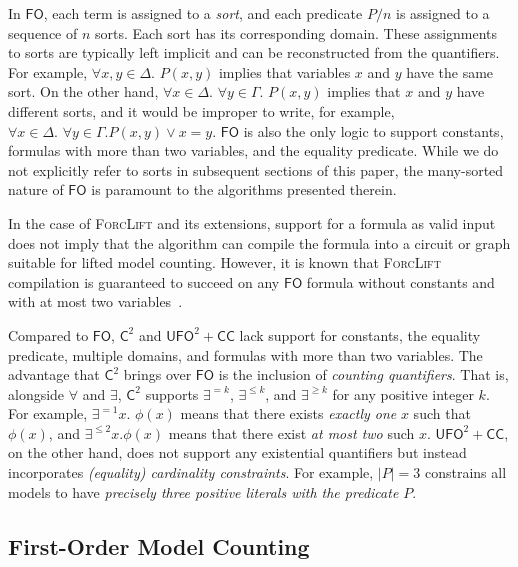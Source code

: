 \documentclass[a4paper,UKenglish,cleveref, autoref, thm-restate]{lipics-v2021}
\newcommand{\Ctwo}{$\mathsf{C}^{2}$}
\newcommand{\FO}{$\mathsf{FO}$}
\newcommand{\UFO}{$\mathsf{UFO}^{2} + \mathsf{CC}$}
\begin{document}
\renewcommand*{\thefootnote}{\arabic{footnote}}

In \FO{}, each term is assigned to a \emph{sort}, and each predicate $P/n$ is
assigned to a sequence of $n$ sorts. Each sort has its corresponding domain.
These assignments to sorts are typically left implicit and can be reconstructed
from the quantifiers. For example, $\forall x,y \in \Delta\text{. }P(x, y)$
implies that variables $x$ and $y$ have the same sort. On the other hand,
$\forall x \in \Delta\text{. }\forall y \in \Gamma\text{. } P(x, y)$ implies
that $x$ and $y$ have different sorts, and it would be improper to write, for
example, $\forall x \in \Delta\text{. }\forall y \in \Gamma\text{.
} P(x, y) \lor x = y$. \FO{} is also the only logic to support constants,
formulas with more than two variables, and the equality predicate. While we do
not explicitly refer to sorts in subsequent sections of this paper, the
many-sorted nature of \FO{} is paramount to the algorithms presented therein.

\begin{remark*}
  In the case of \textsc{ForcLift} and its extensions, support for a formula as
  valid input does not imply that the algorithm can compile the formula into a
  circuit or graph suitable for lifted model counting. However, it is known that
  \textsc{ForcLift} compilation is guaranteed to succeed on any \FO{} formula
  without constants and with at most two
  variables~\cite{DBLP:conf/nips/Broeck11,DBLP:conf/kr/BroeckMD14}.
\end{remark*}

Compared to \FO{}, \Ctwo{} and \UFO{} lack support for constants, the equality
predicate, multiple domains, and formulas with more than two variables. The
advantage that \Ctwo{} brings over \FO{} is the inclusion of \emph{counting
  quantifiers}. That is, alongside $\forall$ and $\exists$, \Ctwo{} supports
$\exists^{=k}$, $\exists^{\le k}$, and $\exists^{\ge k}$ for any positive
integer $k$. For example, $\exists^{=1} x\text{. }\phi(x)$ means that there
exists \emph{exactly one} $x$ such that $\phi(x)$, and $\exists^{\le 2} x\text{.
}\phi(x)$ means that there exist \emph{at most two} such $x$. \UFO{}, on the
other hand, does not support any existential quantifiers but instead
incorporates \emph{(equality) cardinality constraints}. For example, $|P| = 3$
constrains all models to have \emph{precisely three positive literals with the
  predicate $P$}.

\subsection{First-Order Model Counting}
\end{document}
